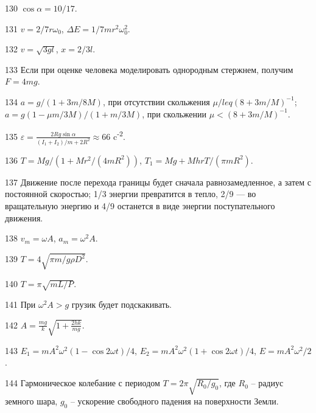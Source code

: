 \begin{Answer}{130}
$\cos \alpha = 10/17$.
\end{Answer}
\begin{Answer}{131}
$v = 2/7r \omega_0$, $\Delta E = 1/7 mr^2 \omega_0^2$.
\end{Answer}
\begin{Answer}{132}
$v = \sqrt{3gl}$, $x = 2/3l$.
\end{Answer}
\begin{Answer}{133}
Если при оценке человека моделировать однородным стержнем, получим $F = 4mg$.
\end{Answer}
\begin{Answer}{134}
$a = g/(1+3m/8M)$, при отсутствии скольжения $\mu /leq (8+3m/M)^{-1}$; $a = g(1 - \mu m/3M)/(1+m/3M)$, при скольжении $\mu < (8+3m/M)^{-1}$.
\end{Answer}
\begin{Answer}{135}
$\varepsilon = \frac{2Rg \sin \alpha}{(I_1 + I_2)/m + 2R^2} \approx 66$ c\textsuperscript{-2}.
\end{Answer}
\begin{Answer}{136}
$T = Mg/(1 + Mr^2/(4mR^2))$, $T_1 = Mg + MhrT/(\pi m R^2)$.
\end{Answer}
\begin{Answer}{137}
Движение после перехода границы будет сначала равнозамедленное, а затем с постоянной скоростью; 1/3 энергии превратится в тепло, 2/9 — во вращательную энергию и 4/9 останется в виде энергии поступательного движения.
\end{Answer}
\begin{Answer}{138}
$v_m = \omega A$, $a_m = \omega^2 A$.
\end{Answer}
\begin{Answer}{139}
$T = 4 \sqrt{\pi m / g \rho D^2}$.
\end{Answer}
\begin{Answer}{140}
$T = \pi \sqrt{m L /P}$.
\end{Answer}
\begin{Answer}{141}
При $\omega^2 A > g$ грузик будет подскакивать.
\end{Answer}
\begin{Answer}{142}
$A = \frac{mg}{k}\sqrt{ 1 + \frac{2hk}{mg}}$.
\end{Answer}
\begin{Answer}{143}
$E_1 = m A^2 \omega^2 (1 - \cos 2 \omega t)/4$, $E_2 = m A^2 \omega^2 (1 + \cos 2 \omega t)/4$, $E = m A^2 \omega^2 /2$.
\end{Answer}
\begin{Answer}{144}
Гармоническое колебание с периодом $T = 2 \pi \sqrt{R_0 / g_0}$, где $R_0$ -- радиус земного шара, $g_0$ -- ускорение свободного падения на поверхности Земли.
\end{Answer}
